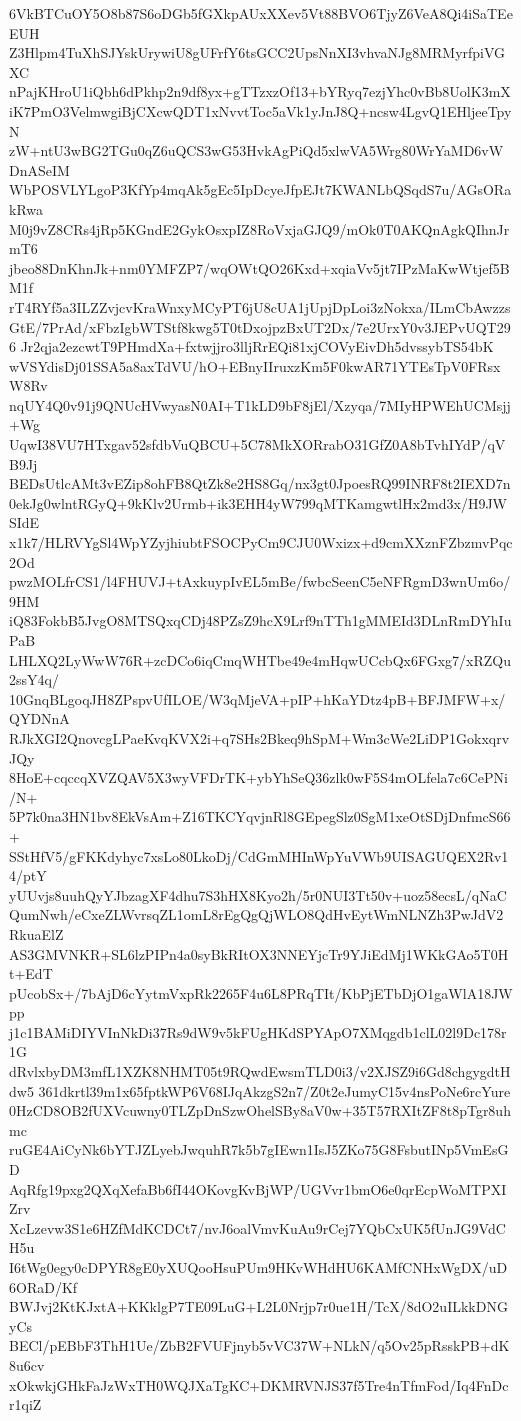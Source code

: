 6VkBTCuOY5O8b87S6oDGb5fGXkpAUxXXev5Vt88BVO6TjyZ6VeA8Qi4iSaTEeEUH
Z3Hlpm4TuXhSJYskUrywiU8gUFrfY6tsGCC2UpsNnXI3vhvaNJg8MRMyrfpiVGXC
nPajKHroU1iQbh6dPkhp2n9df8yx+gTTzxzOf13+bYRyq7ezjYhc0vBb8UolK3mX
iK7PmO3VelmwgiBjCXcwQDT1xNvvtToc5aVk1yJnJ8Q+ncsw4LgvQ1EHljeeTpyN
zW+ntU3wBG2TGu0qZ6uQCS3wG53HvkAgPiQd5xlwVA5Wrg80WrYaMD6vWDnASeIM
WbPOSVLYLgoP3KfYp4mqAk5gEc5IpDcyeJfpEJt7KWANLbQSqdS7u/AGsORakRwa
M0j9vZ8CRs4jRp5KGndE2GykOsxpIZ8RoVxjaGJQ9/mOk0T0AKQnAgkQIhnJrmT6
jbeo88DnKhnJk+nm0YMFZP7/wqOWtQO26Kxd+xqiaVv5jt7IPzMaKwWtjef5BM1f
rT4RYf5a3ILZZvjcvKraWnxyMCyPT6jU8cUA1jUpjDpLoi3zNokxa/ILmCbAwzzs
GtE/7PrAd/xFbzIgbWTStf8kwg5T0tDxojpzBxUT2Dx/7e2UrxY0v3JEPvUQT296
Jr2qja2ezcwtT9PHmdXa+fxtwjjro3lljRrEQi81xjCOVyEivDh5dvssybTS54bK
wVSYdisDj01SSA5a8axTdVU/hO+EBnyIIruxzKm5F0kwAR71YTEsTpV0FRsxW8Rv
nqUY4Q0v91j9QNUcHVwyasN0AI+T1kLD9bF8jEl/Xzyqa/7MIyHPWEhUCMsjj+Wg
UqwI38VU7HTxgav52sfdbVuQBCU+5C78MkXORrabO31GfZ0A8bTvhIYdP/qVB9Jj
BEDsUtlcAMt3vEZip8ohFB8QtZk8e2HS8Gq/nx3gt0JpoesRQ99INRF8t2IEXD7n
0ekJg0wlntRGyQ+9kKlv2Urmb+ik3EHH4yW799qMTKamgwtlHx2md3x/H9JWSIdE
x1k7/HLRVYgSl4WpYZyjhiubtFSOCPyCm9CJU0Wxizx+d9cmXXznFZbzmvPqc2Od
pwzMOLfrCS1/l4FHUVJ+tAxkuypIvEL5mBe/fwbcSeenC5eNFRgmD3wnUm6o/9HM
iQ83FokbB5JvgO8MTSQxqCDj48PZsZ9hcX9Lrf9nTTh1gMMEId3DLnRmDYhIuPaB
LHLXQ2LyWwW76R+zcDCo6iqCmqWHTbe49e4mHqwUCcbQx6FGxg7/xRZQu2ssY4q/
10GnqBLgoqJH8ZPspvUfILOE/W3qMjeVA+pIP+hKaYDtz4pB+BFJMFW+x/QYDNnA
RJkXGI2QnovcgLPaeKvqKVX2i+q7SHs2Bkeq9hSpM+Wm3cWe2LiDP1GokxqrvJQy
8HoE+cqccqXVZQAV5X3wyVFDrTK+ybYhSeQ36zlk0wF5S4mOLfela7c6CePNi/N+
5P7k0na3HN1bv8EkVsAm+Z16TKCYqvjnRl8GEpegSlz0SgM1xeOtSDjDnfmcS66+
SStHfV5/gFKKdyhyc7xsLo80LkoDj/CdGmMHInWpYuVWb9UISAGUQEX2Rv14/ptY
yUUvjs8uuhQyYJbzagXF4dhu7S3hHX8Kyo2h/5r0NUI3Tt50v+uoz58ecsL/qNaC
QumNwh/eCxeZLWvrsqZL1omL8rEgQgQjWLO8QdHvEytWmNLNZh3PwJdV2RkuaElZ
AS3GMVNKR+SL6lzPIPn4a0syBkRItOX3NNEYjcTr9YJiEdMj1WKkGAo5T0Ht+EdT
pUcobSx+/7bAjD6cYytmVxpRk2265F4u6L8PRqTIt/KbPjETbDjO1gaWlA18JWpp
j1c1BAMiDIYVInNkDi37Rs9dW9v5kFUgHKdSPYApO7XMqgdb1clL02l9Dc178r1G
dRvlxbyDM3mfL1XZK8NHMT05t9RQwdEwsmTLD0i3/v2XJSZ9i6Gd8chgygdtHdw5
361dkrtl39m1x65fptkWP6V68IJqAkzgS2n7/Z0t2eJumyC15v4nsPoNe6rcYure
0HzCD8OB2fUXVcuwny0TLZpDnSzwOhelSBy8aV0w+35T57RXItZF8t8pTgr8uhmc
ruGE4AiCyNk6bYTJZLyebJwquhR7k5b7gIEwn1IsJ5ZKo75G8FsbutINp5VmEsGD
AqRfg19pxg2QXqXefaBb6fI44OKovgKvBjWP/UGVvr1bmO6e0qrEcpWoMTPXIZrv
XcLzevw3S1e6HZfMdKCDCt7/nvJ6oalVmvKuAu9rCej7YQbCxUK5fUnJG9VdCH5u
I6tWg0egy0cDPYR8gE0yXUQooHsuPUm9HKvWHdHU6KAMfCNHxWgDX/uD6ORaD/Kf
BWJvj2KtKJxtA+KKklgP7TE09LuG+L2L0Nrjp7r0ue1H/TcX/8dO2uILkkDNGyCs
BECl/pEBbF3ThH1Ue/ZbB2FVUFjnyb5vVC37W+NLkN/q5Ov25pRsskPB+dK8u6cv
xOkwkjGHkFaJzWxTH0WQJXaTgKC+DKMRVNJS37f5Tre4nTfmFod/Iq4FnDcr1qiZ
